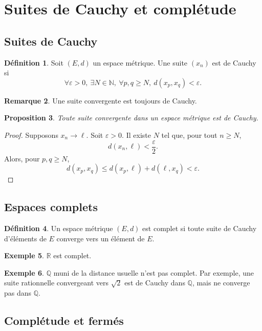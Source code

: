 \documentclass[11pt,a4paper]{article}
\theoremstyle{definition}
\newtheorem{definition}{Définition}[section]
\newtheorem{exemple}[definition]{Exemple}
\newtheorem{remarque}[definition]{Remarque}
\theoremstyle{plain}
\newtheorem{proposition}[definition]{Proposition}
\newcommand{\R}{\mathbb{R}}
\newcommand{\N}{\mathbb{N}}
\newcommand{\Q}{\mathbb{Q}}
\newcommand{\eps}{\varepsilon}
\begin{document}
\section{Suites de Cauchy et complétude}

\subsection{Suites de Cauchy}

\begin{definition}
Soit $(E,d)$ un espace métrique.
Une suite $(x_n)$ est de Cauchy si
\[
\forall \eps>0,\ \exists N\in\N,\ \forall p,q\geq N,\ d(x_p,x_q)<\eps.
\]
\end{definition}

\begin{remarque}
Une suite convergente est toujours de Cauchy.
\end{remarque}

\begin{proposition}
Toute suite convergente dans un espace métrique est de Cauchy.
\end{proposition}

\begin{proof}
Supposons $x_n\to \ell$.
Soit $\eps>0$.
Il existe $N$ tel que, pour tout $n\geq N$,
\[
d(x_n,\ell)<\frac{\eps}{2}.
\]
Alors, pour $p,q\geq N$,
\[
d(x_p,x_q)
\leq d(x_p,\ell)+d(\ell,x_q)
<\eps.
\]
\end{proof}

\subsection{Espaces complets}

\begin{definition}
Un espace métrique $(E,d)$ est complet si toute suite de Cauchy d'éléments de $E$ converge vers un élément de $E$.
\end{definition}

\begin{exemple}
$\R$ est complet.
\end{exemple}

\begin{exemple}
$\Q$ muni de la distance usuelle n'est pas complet.
Par exemple, une suite rationnelle convergeant vers $\sqrt 2$ est de Cauchy dans $\Q$, mais ne converge pas dans $\Q$.
\end{exemple}

\subsection{Complétude et fermés}
\end{document}
